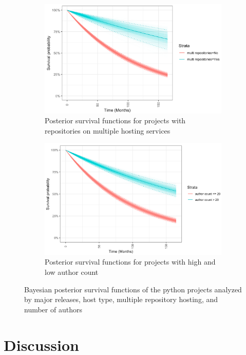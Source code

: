 \documentclass[acmconf]{acmart}
\begin{document}
\begin{figure}[!ht]
\begin{subfigure}[b]{0.45\textwidth}
        \includegraphics[width=\textwidth]{multi_repo_bayes.png}
        \caption{\small Posterior survival functions for projects with repositories on multiple hosting services}
        \label{fig:bayes_multi_repo}
    \end{subfigure}
    \hfill
    \begin{subfigure}[b]{0.45\textwidth}
        \centering 
        \includegraphics[width=\textwidth]{author_count_bayes.png} 
        \caption{\small Posterior survival functions for projects with high and low author count}
        \label{fig:bayes_author_count}
    \end{subfigure}
    \caption{\small Bayesian posterior survival functions of the python projects analyzed by major releases, host type, multiple repository hosting, and number of authors} 
    \label{fig:Bayesian posterior survival functions}
\end{figure}

\section{Discussion} \label{discussion}
\end{document}
